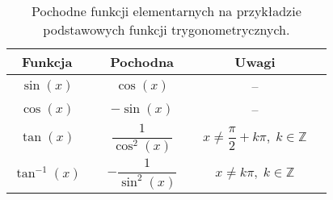 \newpage
\begin{table}[h!]
\caption{Pochodne funkcji elementarnych na przykładzie podstawowych funkcji trygonometrycznych.}
\centering
	\begin{tabular}{c p{3cm} c p{3cm} c p{3cm}}
		\hline
			Funkcja & & Pochodna & & Uwagi\\
		\hline
			$\sin(x)$ & & $\cos(x)$ & & --\\
			$\cos(x)$ & & $-\sin(x)$& & --\\ 
			$\tan(x)$ & & $\dfrac{1}{\cos^2(x)}$& & $x \neq \dfrac{\pi}{2}+k\pi,\; k\in \mathbb Z$ \\
			$\tan^{-1}(x)$ & & $-\dfrac{1}{\sin^2(x)}$ & &$x \neq k\pi,\; k\in \mathbb Z$\\
		\hline
	\end{tabular}
\label{tab:zlewiska}
\end{table}



















